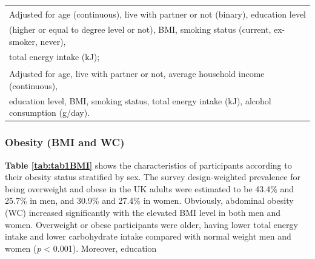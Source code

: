\begin{table}[H]
\begin{tabular}[t]{lccccc}
		\multicolumn{6}{l}{{\scriptsize \textsuperscript{\dag} Adjusted for age (continuous), live with partner or not (binary), education level}}\\ 
		\multicolumn{6}{l}{{\scriptsize (higher or equal to degree level or not), BMI, smoking status (current, ex-smoker, never),}}\\
		\multicolumn{6}{l}{{\scriptsize total energy intake (kJ);}}\\
		\multicolumn{6}{l}{{\scriptsize \textsuperscript{\ddag} Adjusted for age, live with partner or not, average household income (continuous),}}\\ 
		\multicolumn{6}{l}{{\scriptsize education level, BMI, smoking status, total energy intake (kJ), alcohol consumption (g/day).}}\\
	\end{tabular}
\end{table}
\vspace{-0.5cm}


\subsubsection{Obesity (BMI and WC)}\vspace{-0.3cm}

\textbf{Table \ref{tab:tab1BMI}} shows the characteristics of participants according to their obesity status stratified by sex. The survey design-weighted prevalence for being overweight and obese in the UK adults were estimated to be 43.4\% and 25.7\% in men, and 30.9\% and 27.4\% in women. Obviously, abdominal obesity (WC) increased significantly with the elevated BMI level in both men and women. Overweight or obese participants were older, having lower total energy intake and lower carbohydrate intake compared with normal weight men and women (\textit{p} < 0.001). Moreover, education


